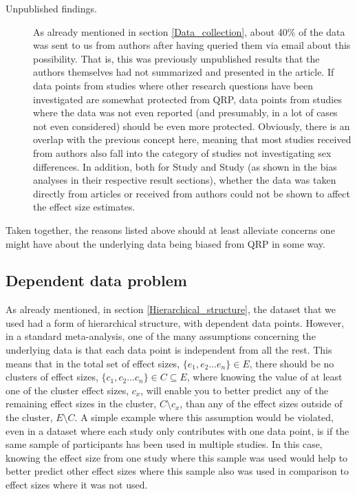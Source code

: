 \begin{description}
\item [Unpublished findings.] As already mentioned in section \ref{Data_collection}, about 40\% of the data was sent to us from authors after having queried them via email about this possibility. That is, this was previously unpublished results that the authors themselves had not summarized and presented in the article. If data points from studies where other research questions have been investigated are somewhat protected from QRP, data points from studies where the data was not even reported (and presumably, in a lot of cases not even considered) should be even more protected. Obviously, there is an overlap with the previous concept here, meaning that most studies received from authors also fall into the category of studies not investigating sex differences. In addition, both for Study  and Study  (as shown in the bias analyses in their respective result sections), whether the data was taken directly from articles or received from authors could not be shown to affect the effect size estimates. \end{description}

Taken together, the reasons listed above should at least alleviate concerns one might have about the underlying data being biased from QRP in some way.

\subsection{Dependent data problem} \label{Dependency} As already mentioned, in section \ref{Hierarchical_structure}, the dataset that we used had a form of hierarchical structure, with dependent data points. However, in a standard meta-analysis, one of the many assumptions concerning the underlying data is that each data point is independent from all the rest. This means that in the total set of effect sizes, $\{e_1, e_2 \dots e_{n}\} \in E$, there should be no clusters of effect sizes, $\{c_1, c_2 \dots c_{n}\} \in C \subseteq E$, where knowing the value of at least one of the cluster effect sizes, $c_x$, will enable you to better predict any of the remaining effect sizes in the cluster, $C \setminus c_{x}$, than any of the effect sizes outside of the cluster, $E \setminus C$. A simple example where this assumption would be violated, even in a dataset where each study only contributes with one data point, is if the same sample of participants has been used in multiple studies. In this case, knowing the effect size from one study where this sample was used would help to better predict other effect sizes where this sample also was used in comparison to effect sizes where it was not used.

